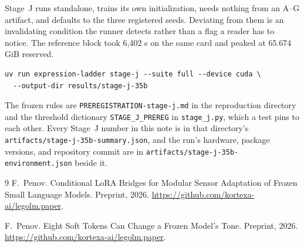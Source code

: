 \documentclass[10pt]{article}
\newcommand{\code}[1]{\texttt{#1}}
\begin{document}
Stage~J runs standalone, trains its own initialization, needs nothing from an
A--G artifact, and defaults to the three registered seeds. Deviating from them
is an invalidating condition the runner detects rather than a flag a reader has
to notice. The reference block took 6,402 s on the same card and peaked at
$65.674$ GiB reserved.

\begin{verbatim}
uv run expression-ladder stage-j --suite full --device cuda \
  --output-dir results/stage-j-35b
\end{verbatim}

The frozen rules are \code{PREREGISTRATION-stage-j.md} in the reproduction
directory and the threshold dictionary \code{STAGE\_J\_PREREG} in
\code{stage\_j.py}, which a test pins to each other. Every Stage~J number in
this note is in that directory's \code{artifacts/stage-j-35b-summary.json},
and the run's hardware, package versions, and repository commit are in
\code{artifacts/stage-j-35b-environment.json} beside it.

\begin{thebibliography}{9}
 F.~Penov. Conditional LoRA Bridges for Modular Sensor
Adaptation of Frozen Small Language Models. Preprint, 2026.
\url{https://github.com/kortexa-ai/legolm.paper}.

 F.~Penov. Eight Soft Tokens Can Change a Frozen
Model's Tone. Preprint, 2026.
\url{https://github.com/kortexa-ai/legolm.paper}.
\end{thebibliography}
\end{document}
